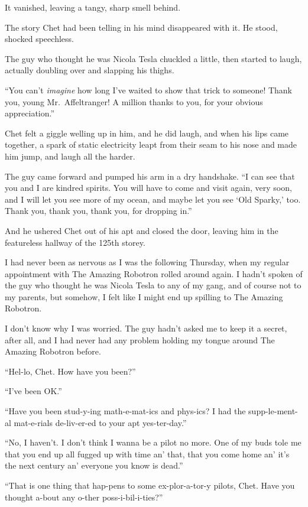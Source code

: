 It vanished, leaving a tangy, sharp smell behind.

The story Chet had been telling in his mind disappeared with it. He
stood, shocked speechless.

The guy who thought he was Nicola Tesla chuckled a little, then
started to laugh, actually doubling over and slapping his thighs.

``You can't \emph{imagine} how long I've waited to show that trick to someone! 
Thank you, young Mr.~Affeltranger! A million thanks to you, for your obvious 
appreciation.''

Chet felt a giggle welling up in him, and he did laugh, and when
his lips came together, a spark of static electricity leapt from
their seam to his nose and made him jump, and laugh all the
harder.

The guy came forward and pumped his arm in a dry handshake.
``I can see that you and I are kindred spirits. You will have to come and visit 
again, very soon, and I will let you see more of my ocean, and maybe let you 
see `Old Sparky,' too. Thank you, thank you, thank you, for dropping in.''

And he ushered Chet out of his apt and closed the door, leaving him
in the featureless hallway of the 125th storey.

\tb

I had never been as nervous as I was the following Thursday, when
my regular appointment with The Amazing Robotron rolled around
again. I hadn't spoken of the guy who thought he was Nicola Tesla
to any of my gang, and of course not to my parents, but somehow, I
felt like I might end up spilling to The Amazing Robotron.

I don't know why I was worried. The guy hadn't asked me to keep it
a secret, after all, and I had never had any problem holding my
tongue around The Amazing Robotron before.

``Hel-lo, Chet. How have you been?''

``I've been OK.''

``Have you been stud-y-ing math-e-mat-ics and phys-ics? I had the 
supp-le-ment-al mat-e-rials de-liv-er-ed to your apt yes-ter-day.''

``No, I haven't. I don't think I wanna be a pilot no more. One of my buds tole 
me that you end up all fugged up with time an' that, that you come home an' 
it's the next century an' everyone you know is dead.''

``That is one thing that hap-pens to some ex-plor-a-tor-y pilots, Chet. Have 
you thought a-bout any o-ther poss-i-bil-i-ties?''

